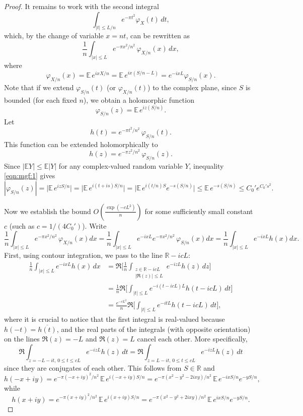 \documentclass[reqno]{amsart}
\newcommand\R{{\mathbb{R}}}
\theoremstyle{plain}
\theoremstyle{definition}
\begin{document}
\begin{proof}
It remains to work with the second integral 
\[
\int_{|t| \le L/n} e^{-\pi t^{2}} \varphi_{X}(t) \, dt,
\]
which, by the change of variable \(x = nt\), can be rewritten as
\[
\frac{1}{n} \int_{|x| \le L} e^{-\pi x^{2}/n^{2}} \, \varphi_{X/n}(x) \, dx,
\]
where
\[
\varphi_{X/n}(x) = \mathbb{E} \, e^{i x X/n} = \mathbb{E} \, e^{i x (S/n - L)} = e^{-i xL}\varphi_{S/n}(x).
\]
Note that if we extend \(\varphi_{S/n}(t)\) (or  \(\varphi_{X/n}(t)\)) to the complex plane, since \(S\) is bounded (for each fixed \(n\)), we obtain a holomorphic function
\[
\varphi_{S/n}(z) =  \mathbb{E} \, e^{i z (S/n)}.
\]
Let
\[
h(t) = e^{-\pi t^{2}/n^{2}} \, \varphi_{S/n}(t).
\]
This function can be extended holomorphically to
\[
h(z) = e^{-\pi z^{2}/n^{2}} \, \varphi_{S/n}(z).
\]
Since $|\mathbb{E} Y| \le \mathbb{E}|Y|$ for any complex-valued random variable $Y$, inequality \eqref{eqn:mgf:1} gives  \begin{equation}\label{eqn:CS:1} 
|\varphi_{S/n}(z)| = \Big|\mathbb{E} \, e^{i z S/n} \Big|= \Big|\mathbb{E} \, e^{i (t+ i s) S/n} \Big|= \Big|\mathbb{E} \, e^{i (t/n) S} e^{-s (S/n)} \Big|\le \mathbb{E} \, e^{-s (S/n)} \le C_{0}'e^{C_{0}' s^{2}}.
\end{equation}

Now we establish the bound \(O(\frac{\exp(-c L^{2})}{n})\) for some sufficiently small constant \(c\) (such as \(c = 1/(4C_{0}')\)). Write 
$$ \frac{1}{n} \int_{|x| \le L} e^{-\pi x^{2}/n^{2}} \, \varphi_{X/n}(x) dx=\frac{1}{n} \int_{|x| \le L}  e^{-i xL} e^{-\pi x^{2}/n^{2}} \, \varphi_{S/n}(x)dx= \frac{1}{n} \int_{|x| \le L} e^{-i xL} h(x)dx.$$
First, using contour integration, we pass to the line \(\R - i c L \):
\begin{align}\label{eqn:contour}
\frac{1}{n} \int_{|x| \le L} e^{-i x L} h(x) \, dx
&= \Re \Big[ \frac{1}{n} \int_{\substack{z \in \R - i c L \\ |\Re(z)| \le L}} e^{-i z L} h(z) \, dz \Big] \nonumber \\
&= \frac{1}{n} \Re \Big[ \int_{|t| \le L} e^{-i (t - i c L) L} h(t - i c L ) \, dt \Big] \nonumber \\
&= \frac{e^{-c L^{2}}}{n} \Re \Big[ \int_{|t| \le L} e^{-i t L} h(t - i c L ) \, dt \Big],
\end{align}
where it is crucial to notice that the first integral is real-valued because \(h(-t) = \overline{h(t)}\), and the real parts of the integrals (with opposite orientation) on the lines \(\Re(z) = -L\) and \(\Re(z) = L\) cancel each other.  
More specifically,
\[
\Re \int_{z = -L - i t,\, 0 \le t \le c L} e^{-i z L} h(z) \, dt
= \Re \int_{z = L - i t,\, 0 \le t \le c L} e^{-i z L} h(z) \, dt
\]
since they are conjugates of each other.  
This follows from \(S \in \R\) and
\[
h(-x + i y) = e^{-\pi (-x + i y)^{2}/n^{2}} \, \mathbb{E} \, e^{i (-x + i y) S / n}
= e^{-\pi (x^{2} - y^{2} - 2 i x y)/n^{2}} \, \mathbb{E} \, e^{-i x S / n} e^{-y S / n},
\]
while
\[
h(x + i y) = e^{-\pi (x + i y)^{2}/n^{2}} \, \mathbb{E} \, e^{i (x + i y) S / n}
= e^{-\pi (x^{2} - y^{2} + 2 i x y)/n^{2}} \, \mathbb{E} \, e^{i x S / n} e^{-y S / n}.
\]


\end{proof}
\end{document}
